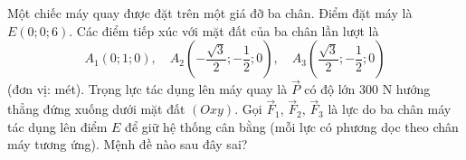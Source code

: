\begin{ex}
Một chiếc máy quay được đặt trên một giá đỡ ba chân. Điểm đặt máy là $E(0;0;6)$. Các điểm tiếp xúc với mặt đất của ba chân lần lượt là
\[A_1(0;1;0),\quad A_2\left(-\dfrac{\sqrt3}2;-\dfrac12;0\right),\quad A_3\left(\dfrac{\sqrt3}2;-\dfrac12;0\right)\]
(đơn vị: mét). Trọng lực tác dụng lên máy quay là $\vec P$ có độ lớn $300$ N hướng thẳng đứng xuống dưới mặt đất $(Oxy)$. Gọi $\vec F_1$, $\vec F_2$, $\vec F_3$ là lực do ba chân máy tác dụng lên điểm $E$ để giữ hệ thống cân bằng (mỗi lực có phương dọc theo chân máy tương ứng).
Mệnh đề nào sau đây sai?
\end{ex}
